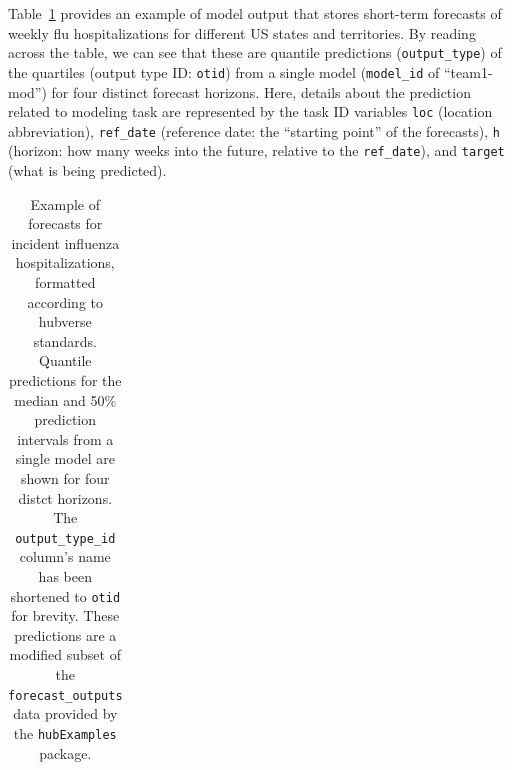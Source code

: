 \documentclass[
  letterpaper,
  DIV=11,
  numbers=noendperiod]{scrartcl}
\begin{document}
Table~\ref{tbl-example-forecasts} provides an example of model output
that stores short-term forecasts of weekly flu hospitalizations for
different US states and territories. By reading across the table, we can
see that these are quantile predictions (\texttt{output\_type}) of the
quartiles (output type ID: \texttt{otid}) from a single model
(\texttt{model\_id} of ``team1-mod'') for four distinct forecast
horizons. Here, details about the prediction related to modeling task
are represented by the task ID variables \texttt{loc} (location
abbreviation), \texttt{ref\_date} (reference date: the ``starting
point'' of the forecasts), \texttt{h} (horizon: how many weeks into the
future, relative to the \texttt{ref\_date}), and \texttt{target} (what
is being predicted).

\begin{longtable}[]{@{}
  >{\raggedright\arraybackslash}p{}
  >{\raggedright\arraybackslash}p{}
  >{\raggedright\arraybackslash}p{}
  >{\raggedleft\arraybackslash}p{}
  >{\raggedright\arraybackslash}p{}
  >{\raggedright\arraybackslash}p{}
  >{\raggedright\arraybackslash}p{}
  >{\raggedleft\arraybackslash}p{}@{}}

\caption{\label{tbl-example-forecasts}Example of forecasts for incident
influenza hospitalizations, formatted according to hubverse standards.
Quantile predictions for the median and 50\% prediction intervals from a
single model are shown for four distct horizons. The
\texttt{output\_type\_id} column's name has been shortened to
\texttt{otid} for brevity. These predictions are a modified subset of
the \texttt{forecast\_outputs} data provided by the \texttt{hubExamples}
package.}

\tabularnewline


\end{longtable}
\end{document}
